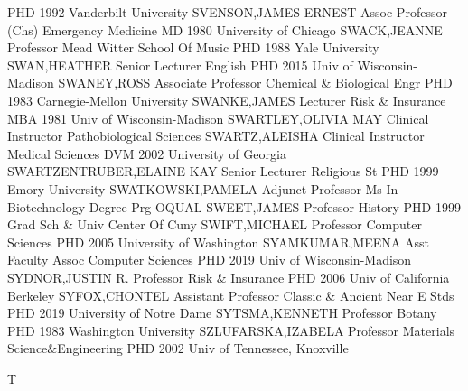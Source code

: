 \documentclass[
]{article}
\begin{document}
\textbar PHD 1992 Vanderbilt University \textbar{} 
\textbar SVENSON,JAMES ERNEST \textbar Assoc Professor (Chs)
\textbar Emergency Medicine \textbar MD 1980 University of Chicago
\textbar{}  \textbar SWACK,JEANNE \textbar Professor
\textbar Mead Witter School Of Music \textbar PHD 1988 Yale University
\textbar{}  \textbar SWAN,HEATHER \textbar Senior Lecturer
\textbar English \textbar PHD 2015 Univ of Wisconsin-Madison \textbar{}
 \textbar SWANEY,ROSS \textbar Associate Professor
\textbar Chemical \& Biological Engr \textbar PHD 1983 Carnegie-Mellon
University \textbar{}  \textbar SWANKE,JAMES
\textbar Lecturer \textbar Risk \& Insurance \textbar MBA 1981 Univ of
Wisconsin-Madison \textbar{}  \textbar SWARTLEY,OLIVIA MAY
\textbar Clinical Instructor \textbar Pathobiological Sciences
\textbar SWARTZ,ALEISHA \textbar{}  \textbar Clinical
Instructor \textbar Medical Sciences \textbar DVM 2002 University of
Georgia \textbar SWARTZENTRUBER,ELAINE KAY \textbar{} 
\textbar Senior Lecturer \textbar Religious St \textbar PHD 1999 Emory
University \textbar SWATKOWSKI,PAMELA \textbar{} 
\textbar Adjunct Professor \textbar Ms In Biotechnology Degree Prg
\textbar OQUAL \textbar SWEET,JAMES \textbar{} 
\textbar Professor \textbar History \textbar PHD 1999 Grad Sch \& Univ
Center Of Cuny \textbar SWIFT,MICHAEL \textbar{} 
\textbar Professor \textbar Computer Sciences \textbar PHD 2005
University of Washington \textbar SYAMKUMAR,MEENA \textbar{}
 \textbar Asst Faculty Assoc \textbar Computer Sciences
\textbar PHD 2019 Univ of Wisconsin-Madison \textbar SYDNOR,JUSTIN R.
\textbar{}  \textbar Professor \textbar Risk \& Insurance
\textbar PHD 2006 Univ of California Berkeley \textbar SYFOX,CHONTEL
\textbar{}  \textbar Assistant Professor \textbar Classic \&
Ancient Near E Stds \textbar PHD 2019 University of Notre Dame
\textbar SYTSMA,KENNETH \textbar{}  \textbar Professor
\textbar Botany \textbar PHD 1983 Washington University
\textbar SZLUFARSKA,IZABELA \textbar{}  \textbar Professor
\textbar Materials Science\&Engineering \textbar PHD 2002 Univ of
Tennessee, Knoxville \textbar{}

T

\textbar{}  \textbar{}
\end{document}
